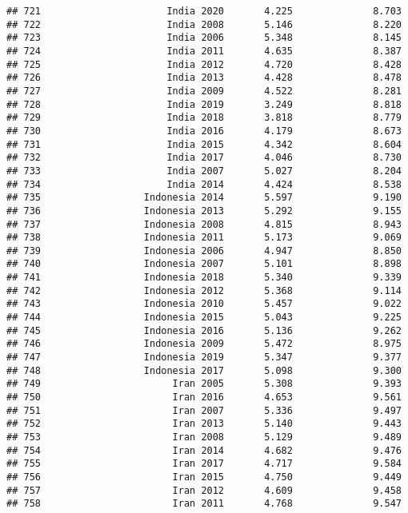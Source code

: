 \documentclass[
]{article}
\begin{document}
\begin{verbatim}
## 721                      India 2020       4.225              8.703
## 722                      India 2008       5.146              8.220
## 723                      India 2006       5.348              8.145
## 724                      India 2011       4.635              8.387
## 725                      India 2012       4.720              8.428
## 726                      India 2013       4.428              8.478
## 727                      India 2009       4.522              8.281
## 728                      India 2019       3.249              8.818
## 729                      India 2018       3.818              8.779
## 730                      India 2016       4.179              8.673
## 731                      India 2015       4.342              8.604
## 732                      India 2017       4.046              8.730
## 733                      India 2007       5.027              8.204
## 734                      India 2014       4.424              8.538
## 735                  Indonesia 2014       5.597              9.190
## 736                  Indonesia 2013       5.292              9.155
## 737                  Indonesia 2008       4.815              8.943
## 738                  Indonesia 2011       5.173              9.069
## 739                  Indonesia 2006       4.947              8.850
## 740                  Indonesia 2007       5.101              8.898
## 741                  Indonesia 2018       5.340              9.339
## 742                  Indonesia 2012       5.368              9.114
## 743                  Indonesia 2010       5.457              9.022
## 744                  Indonesia 2015       5.043              9.225
## 745                  Indonesia 2016       5.136              9.262
## 746                  Indonesia 2009       5.472              8.975
## 747                  Indonesia 2019       5.347              9.377
## 748                  Indonesia 2017       5.098              9.300
## 749                       Iran 2005       5.308              9.393
## 750                       Iran 2016       4.653              9.561
## 751                       Iran 2007       5.336              9.497
## 752                       Iran 2013       5.140              9.443
## 753                       Iran 2008       5.129              9.489
## 754                       Iran 2014       4.682              9.476
## 755                       Iran 2017       4.717              9.584
## 756                       Iran 2015       4.750              9.449
## 757                       Iran 2012       4.609              9.458
## 758                       Iran 2011       4.768              9.547

\end{verbatim}
\end{document}
